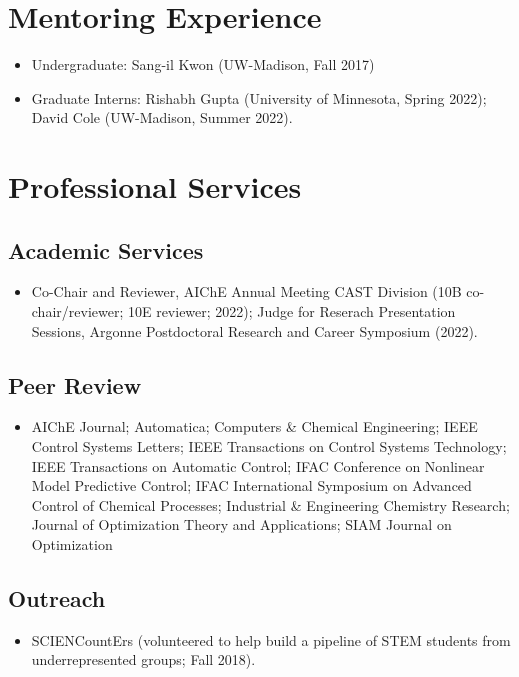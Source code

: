 \documentclass{article}
\begin{document}
\section*{Mentoring Experience}
\begin{itemize}[leftmargin=*]
\item[] Undergraduate: Sang-il Kwon (UW-Madison, Fall 2017)
\item[] Graduate Interns: Rishabh Gupta (University of Minnesota, Spring 2022); David Cole (UW-Madison, Summer 2022).
\end{itemize}

\section*{Professional Services}
\subsection*{Academic Services}
\begin{itemize}[leftmargin=*]
  \item[] Co-Chair and Reviewer, AIChE Annual Meeting CAST Division (10B co-chair/reviewer; 10E reviewer; 2022); Judge for Reserach Presentation Sessions, Argonne Postdoctoral Research and Career Symposium (2022).
\end{itemize}

\subsection*{Peer Review}
\begin{itemize}[leftmargin=*]
\item[] AIChE Journal; Automatica; Computers \& Chemical Engineering; IEEE Control Systems Letters; IEEE Transactions on Control Systems Technology; IEEE Transactions on Automatic Control; IFAC Conference on Nonlinear Model Predictive Control; IFAC International Symposium on Advanced Control of Chemical Processes; Industrial \& Engineering Chemistry Research; Journal of Optimization Theory and Applications; SIAM Journal on Optimization
\end{itemize}

\subsection*{Outreach}
\begin{itemize}[leftmargin=*]
\item[] SCIENCountErs (volunteered to help build a pipeline of STEM students from underrepresented groups; Fall 2018).
\end{itemize}
\end{document}

